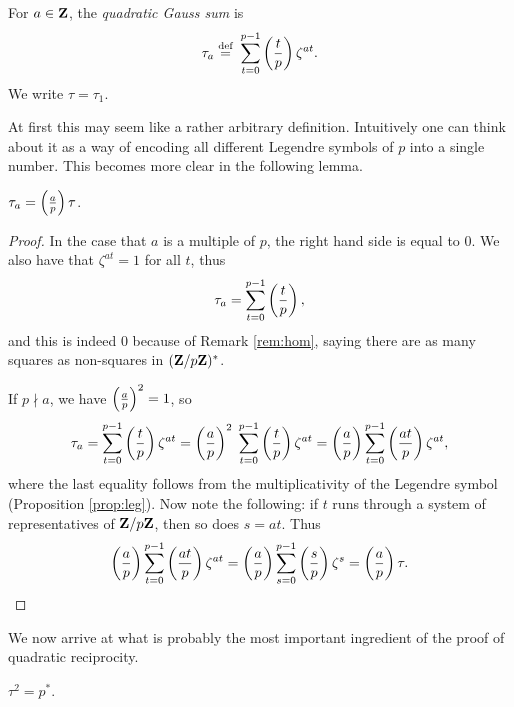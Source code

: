 \documentclass[11pt]{amsart}
\begin{document}
\begin{defi}
For $a\in \bf Z$, the \emph{quadratic Gauss sum} is
\[\tau_a \deff \; \sum_{t=0}^{p-1} \leg tp \zeta^{at} .\] We write $\tau = \tau_1$.
\end{defi}
At first this may seem like a rather arbitrary definition. Intuitively one can think about it as a way of encoding all different Legendre symbols of $p$ into a single number. This becomes more clear in the following lemma.

\begin{lemma}
\label{lem:tau}
$\tau_a = \leg ap \tau$.
\end{lemma}

\begin{proof}
In the case that $a$ is a multiple of $p$, the right hand side is equal to 0. We also have that $\zeta^{at}=1$ for all $t$, thus  \[\tau_a = \sum_{t=0}^{p-1} \leg tp,\] and this is indeed $0$ because of Remark \ref{rem:hom}, saying there are as many squares as non-squares in $(\bf Z /p\bf Z)^*$.

If $p\nmid a$, we have $\leg{a}{p}^2=1$, so
\[ \tau_a = \sum_{t=0}^{p-1} \leg tp \zeta^{at} =\leg{a}{p}^2 \; \sum_{t=0}^{p-1} \leg {t}{p} \zeta^{at}= \leg{a}{p}\sum_{t=0}^{p-1} \leg {at}{p} \zeta^{at},\] 
where the last equality follows from the multiplicativity of the Legendre symbol (Proposition \ref{prop:leg}).
Now note the following: if $t$ runs through a system of representatives of $\bf Z /p\bf Z$, then so does $s=at$. Thus
\[\leg{a}{p}\sum_{t=0}^{p-1} \leg {at}{p} \zeta^{at}=\leg ap \sum_{s=0}^{p-1} \leg {s}{p} \zeta^{s} = \leg ap \tau.\qedhere\]
\end{proof}

We now arrive at what is probably the most important ingredient of the proof of quadratic reciprocity.
\begin{prop}
\label{prop:pst}
$\tau^2 = p^*$.
\end{prop}
\end{document}
